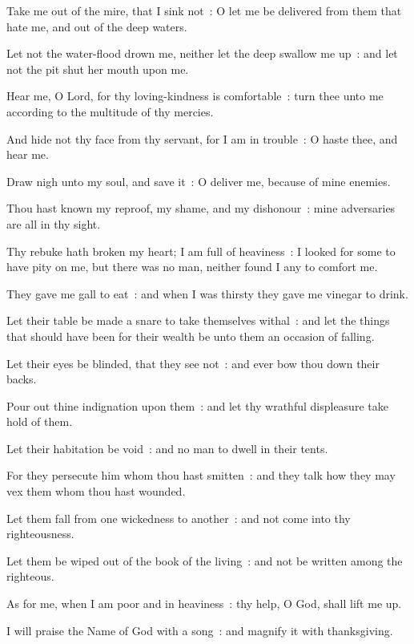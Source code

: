 Take me out of the mire, that I sink not~: O let me be delivered from them that hate me, and out of the deep waters.\par
{}Let not the water-flood drown me, neither let the deep swallow me up~: and let not the pit shut her mouth upon me.\par
{}Hear me, O Lord, for thy loving-kindness is comfortable~: turn thee unto me according to the multitude of thy mercies.\par
{}And hide not thy face from thy servant, for I am in trouble~: O haste thee, and hear me.\par
{}Draw nigh unto my soul, and save it~: O deliver me, because of mine enemies.\par
{}Thou hast known my reproof, my shame, and my dishonour~: mine adversaries are all in thy sight.\par
{}Thy rebuke hath broken my heart; I am full of heaviness~: I looked for some to have pity on me, but there was no man, neither found I any to comfort me.\par
{}They gave me gall to eat~: and when I was thirsty they gave me vinegar to drink.\par
{}Let their table be made a snare to take themselves withal~: and let the things that should have been for their wealth be unto them an occasion of falling.\par
{}Let their eyes be blinded, that they see not~: and ever bow thou down their backs.\par
{}Pour out thine indignation upon them~: and let thy wrathful displeasure take hold of them.\par
{}Let their habitation be void~: and no man to dwell in their tents.\par
{}For they persecute him whom thou hast smitten~: and they talk how they may vex them whom thou hast wounded.\par
{}Let them fall from one wickedness to another~: and not come into thy righteousness.\par
{}Let them be wiped out of the book of the living~: and not be written among the righteous.\par
{}As for me, when I am poor and in heaviness~: thy help, O God, shall lift me up.\par
{}I will praise the Name of God with a song~: and magnify it with thanksgiving.\par
